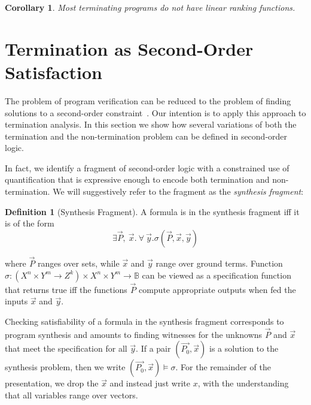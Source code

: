 \documentclass[preprint]{sigplanconf}
\newtheorem{corollary}[theorem]{Corollary}
\theoremstyle{definition}
\newtheorem{definition}[theorem]{Definition}
\begin{document}
\begin{corollary}
 Most terminating programs do not have linear ranking functions.
\end{corollary}
\fi


\section{Termination as Second-Order Satisfaction} \label{sec:second.order}



The problem of program verification can be reduced to the problem of finding
solutions to a second-order
constraint~\cite{DBLP:conf/pldi/GrebenshchikovLPR12,DBLP:conf/pldi/GulwaniSV08}. 
Our intention is to apply this approach to termination analysis.  In this
section we show how several variations of both the termination and the
non-termination problem can be defined in second-order logic.
%

In fact, we identify a fragment of second-order logic with a constrained use
of quantification that is expressive enough to encode both termination and
non-termination.  We will suggestively refer to the fragment as the
\emph{synthesis fragment}:


\begin{definition}[Synthesis Fragment]
 A formula is in the synthesis fragment iff it is of the form
 \[
  \exists \vec{P},~ \vec{x} . ~\forall~ \vec{y} . \sigma(\vec{P}, \vec{x}, \vec{y})
 \]

where $\vec{P}$ ranges over sets, while $\vec{x}$ and $\vec{y}$ range over ground terms.
Function $\sigma: (X^n \times Y^m \to Z^k) \times X^n \times Y^m  \to \mathbb{B}$ can be viewed as a specification function
that  returns true iff the functions $\vec{P}$ compute appropriate outputs
when fed the inputs $\vec{x}$ and $\vec{y}$.  
\end{definition}
%
Checking satisfiability of a formula in the synthesis fragment corresponds to program synthesis and
amounts to finding witnesses for the unknowns $\vec{P}$ and $\vec{x}$ that meet the specification
for all $\vec{y}$. 
If a pair $(\vec{P_0}, \vec{x})$ is a solution to the synthesis problem, then we write $(\vec{P_0}, \vec{x}) \models \sigma$.
For the remainder of the presentation, we drop the $\vec{x}$ and instead just write $x$, with the understanding
that all variables range over vectors.
\end{document}
